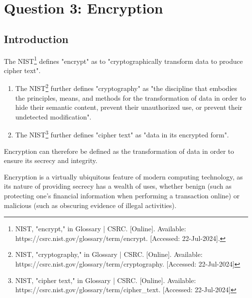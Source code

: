 \section{Question 3: Encryption} %
\label{sec:Question 3: Encryption}

\subsection{Introduction} %
\label{sub:Introduction}

\begin{myenum}
	\item The NIST\footnote{NIST, "encrypt," in Glossary | CSRC. [Online]. Available: https://csrc.nist.gov/glossary/term/encrypt. [Accessed: 22-Jul-2024].} defines "encrypt" as to "cryptographically transform data to produce cipher text".
		\begin{enumerate}
			\item The NIST\footnote{NIST, "cryptography," in Glossary | CSRC. [Online]. Available: https://csrc.nist.gov/glossary/term/cryptography. [Accessed: 22-Jul-2024]} further defines "cryptography" as "the discipline that embodies the principles, means, and methods for the transformation of data in order to hide their semantic content, prevent their unauthorized use, or prevent their undetected modification".
			\item The NIST\footnote{NIST, "cipher text," in Glossary | CSRC. [Online]. Available: https://csrc.nist.gov/glossary/term/cipher\_text. [Accessed: 22-Jul-2024]} further defines "cipher text" as "data in its encrypted form".
		\end{enumerate}
	\item Encryption can therefore be defined as the transformation of data in order to ensure its secrecy and integrity.
	\item Encryption is a virtually ubiquitous feature of modern computing technology, as its nature of providing secrecy has a wealth of uses, whether benign (such as protecting one's financial information when performing a transaction online) or malicious (such as obscuring evidence of illegal activities).
\end{myenum}

